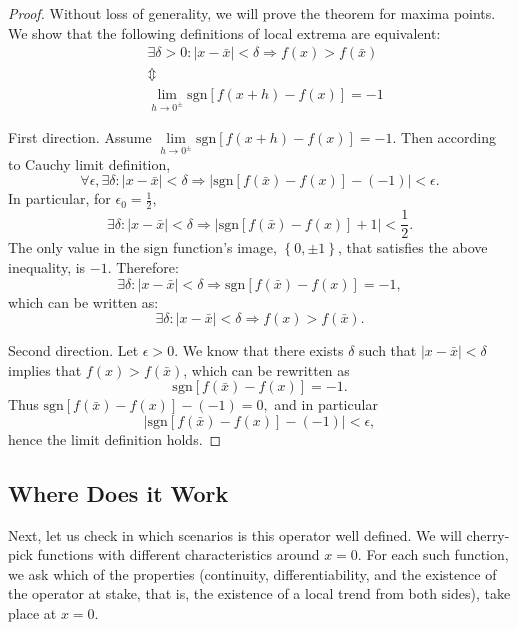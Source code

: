 \documentclass[11pt]{book}
\begin{document}
\begin{proof}Without loss of generality, we will prove the theorem for maxima points. We show that the following definitions of local extrema are equivalent: $$\begin{array}{ccc}
& \exists\delta>0:\left|x-\bar{x}\right|<\delta\Longrightarrow f\left(x\right)>f\left(\bar{x}\right)\\
& \Updownarrow\\
& \underset{{\scriptscriptstyle h\rightarrow0^{\pm}}}{\lim}\text{sgn}\left[f\left(x+h\right)-f\left(x\right)\right]=-1
\end{array}$$

First direction. Assume $\underset{{\scriptscriptstyle h\rightarrow0^{\pm}}}{\lim}\text{sgn}\left[f \left(x+h\right)-f\left(x\right)\right]=-1.$ Then according to Cauchy limit definition,
$$\forall\epsilon,\exists\delta:\left|x-\bar{x}\right| < \delta\Longrightarrow\left|\text{sgn}\left[f\left(\bar{x}\right)-f\left(x\right)\right]-\left(-1\right)\right| < \epsilon.$$
In particular, for $\epsilon_{0}=\frac{1}{2}$, $$\exists\delta:\left|x-\bar{x}\right|<\delta\Longrightarrow\left|\text{sgn}\left[f\left(\bar{x}\right)-f\left(x\right)\right]+1\right|<\frac{1}{2}.$$
The only value in the sign function’s image, $\left\{ 0,\pm1\right\}$, that satisfies the above inequality, is $-1$. Therefore:
$$\exists\delta:\left|x-\bar{x}\right|<\delta\Longrightarrow \text{sgn}\left[f\left(\bar{x}\right)-f\left(x\right)\right]=-1,$$
which can be written as:
$$\exists\delta:\left|x-\bar{x}\right|<\delta\Longrightarrow f\left(x\right)>f\left(\bar{x}\right).$$

Second direction. Let $\epsilon>0$. We know that there exists $\delta$ such that $\left|x-\bar{x}\right| < \delta$ implies that $f\left(x\right)>f\left(\bar{x}\right)$, which can be rewritten as $$\text{sgn}\left[f\left(\bar{x}\right)-f\left(x\right)\right]=-1.$$ Thus $\text{sgn}\left[f\left(\bar{x}\right)-f\left(x\right)\right]-\left(-1\right)=0,$ and in particular $$\left|\text{sgn}\left[f\left(\bar{x}\right)-f\left(x\right)\right]-\left(-1\right)\right|<\epsilon,$$hence the limit definition holds.

\end{proof}

\subsection{Where Does it Work}

Next, let us check in which scenarios is this operator well defined. We will cherry-pick functions with different characteristics around $x=0$. For each such function, we ask which of the properties (continuity, differentiability, and the existence of the operator at stake, that is, the existence of a local trend from both sides), take place at $x=0$.
\end{document}
